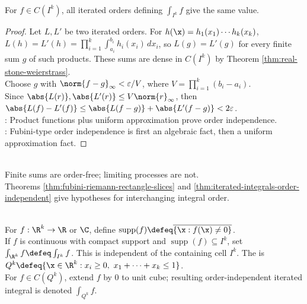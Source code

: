\begin{theorem} \label{thm:iterated-integrals-order-independent} \\
For $f\in C(I^k)$, all iterated orders defining $\int_{I^k}f$ give the same value.
\begin{proof}
Let $L,L'$ be two iterated orders. For $h(\x)=h_1(x_1)\cdots h_k(x_k)$, $L(h)=L'(h)=\prod\limits_{i=1}^k\int_{a_i}^{b_i}h_i(x_i)\,dx_i$, so $L(g)=L'(g)$ for every finite sum $g$ of such products. These sums are dense in $C(I^k)$ by Theorem \ref{thm:real-stone-weierstrass}.\\
Choose $g$ with $\norm{f-g}_\infty<\varepsilon/V$, where $V=\prod\limits_{i=1}^k(b_i-a_i)$.\\
Since $\abs{L(r)},\abs{L'(r)}\leq V\norm{r}_\infty$, then $\abs{L(f)-L'(f)}\leq\abs{L(f-g)}+\abs{L'(f-g)}<2\varepsilon$.\\
: Product functions plus uniform approximation prove order independence.\\
: Fubini-type order independence is first an algebraic fact, then a uniform approximation fact.
\end{proof}
\end{theorem}

\begin{perspective} \label{per:fubini-hypotheses-control-order} \\
Finite sums are order-free; limiting processes are not.\\
Theorems \ref{thm:fubini-riemann-rectangle-slices} and \ref{thm:iterated-integrals-order-independent} give hypotheses for interchanging integral order.
\end{perspective}

\begin{definition} \label{def:support-and-compact-support-integral} \\
For $f:\R^k\to\R$ or $\C$, define $\operatorname{supp}(f)\defeq\overline{\{\x:f(\x)\neq0\}}$.\\
If $f$ is continuous with compact support and $\operatorname{supp}(f)\subseteq I^k$, set $\int_{\R^k}f\defeq\int_{I^k}f$. This is independent of the containing cell $I^k$. The  is $Q^k\defeq\{\x\in\R^k:x_i\geq0,\ x_1+\cdots+x_k\leq1\}$.\\
For $f\in C(Q^k)$, extend $f$ by $0$ to unit cube; resulting order-independent iterated integral is denoted $\int_{Q^k}f$.
\end{definition}

